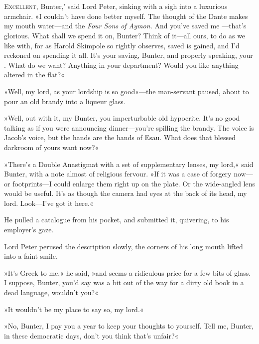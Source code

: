 \chapter[Chapter \thechapter]{}
\lettrine[lines=4,ante=‘]{E}{xcellent}, Bunter,' said Lord Peter, sinking with a sigh into a luxurious armchair. »I couldn't have done better myself. The thought of the Dante makes my mouth water\allowbreak---\allowbreak and the \textit{Four Sons of Aymon.} And you've saved me \allowbreak---\allowbreak that's glorious. What shall we spend it on, Bunter? Think of it\allowbreak---\allowbreak all ours, to do as we like with, for as Harold Skimpole so rightly observes,  saved is  gained, and I'd reckoned on spending it all. It's your saving, Bunter, and properly speaking, your . What do we want? Anything in your department? Would you like anything altered in the flat?«

»Well, my lord, as your lordship is so good«---the man-servant paused, about to pour an old brandy into a liqueur glass.

»Well, out with it, my Bunter, you imperturbable old hypocrite. It's no good talking as if you were announcing dinner\allowbreak---\allowbreak you're spilling the brandy. The voice is Jacob's voice, but the hands are the hands of Esau. What does that blessed darkroom of yours want now?«

»There's a Double Anastigmat with a set of supplementary lenses, my lord,« said Bunter, with a note almost of religious fervour. »If it was a case of forgery now\allowbreak---\allowbreak or footprints\allowbreak---\allowbreak I could enlarge them right up on the plate. Or the wide-angled lens would be useful. It's as though the camera had eyes at the back of its head, my lord. Look\allowbreak---\allowbreak I've got it here.«

He pulled a catalogue from his pocket, and submitted it, quivering, to his employer's gaze.

Lord Peter perused the description slowly, the corners of his long mouth lifted into a faint smile.

»It's Greek to me,« he said, »and  seems a ridiculous price for a few bits of glass. I suppose, Bunter, you'd say  was a bit out of the way for a dirty old book in a dead language, wouldn't you?«

»It wouldn't be my place to say so, my lord.«

»No, Bunter, I pay you  a year to keep your thoughts to yourself. Tell me, Bunter, in these democratic days, don't you think that's unfair?«

